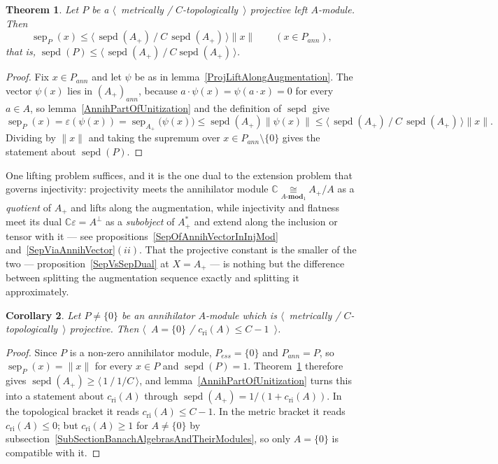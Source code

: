 \documentclass[11pt]{article}
\theoremstyle{plain}
\newtheorem{theorem}{Theorem}[section]
\newtheorem{corollary}[theorem]{Corollary}
\theoremstyle{definition}
\newcommand{\isom}[1]{\mathrel{\mathop{\cong}\limits_{#1}}}
\DeclareMathOperator{\sep}{sep}
\DeclareMathOperator{\sepd}{sepd}
\newcommand{\cri}{c_{\mathrm{ri}}}
\begin{document}
\begin{theorem}\label{SepOfProjMod}
Let $P$ be a $\langle$~metrically / $C$-topologically~$\rangle$ projective left
$A$-module. Then
\[
\sep_P(x)\leq\langle\,\sepd(A_+)\ /\ C\,\sepd(A_+)\,\rangle\lVert x\rVert
\qquad(x\in P_{ann}),
\]
that is, $\sepd(P)\leq\langle\,\sepd(A_+)\ /\ C\sepd(A_+)\,\rangle$.
\end{theorem}

\begin{proof}
Fix $x\in P_{ann}$ and let $\psi$ be as in
lemma~\ref{ProjLiftAlongAugmentation}. The vector $\psi(x)$ lies in
${(A_+)}_{ann}$, because $a\cdot\psi(x)=\psi(a\cdot x)=0$ for every $a\in A$, so
lemma~\ref{AnnihPartOfUnitization} and the definition of $\sepd$ give
\[
\sep_P(x)=\varepsilon(\psi(x))=\sep_{A_+} \bigl(\psi(x) \bigr)
\leq\sepd(A_+)\lVert\psi(x)\rVert
\leq\langle\,\sepd(A_+)\ /\ C\,\sepd(A_+)\,\rangle\lVert x\rVert .
\]
Dividing by $\lVert x\rVert$ and taking the supremum over
$x\in P_{ann}\setminus \{0 \}$ gives the statement about $\sepd(P)$.
\end{proof}

One lifting problem suffices, and it is the one dual to the extension problem
that governs injectivity: projectivity meets the annihilator module
$\mathbb{C}\isom{A\text{-}\mathbf{mod}_1}A_+/A$ as a \emph{quotient} of $A_+$ and
lifts along the augmentation, while injectivity and flatness meet its dual
$\mathbb{C}\varepsilon=A^\perp$ as a \emph{subobject} of $A_+^*$ and extend along
the inclusion or tensor with it --- see
propositions~\ref{SepOfAnnihVectorInInjMod} and~\ref{SepViaAnnihVector}$(ii)$.
That the projective constant is the smaller of the two ---
proposition~\ref{SepVsSepDual} at $X=A_+$ --- is nothing but the difference
between splitting the augmentation sequence exactly and splitting it
approximately.

\begin{corollary}\label{ProjAnnihMod}
Let $P\neq \{0 \}$ be an annihilator $A$-module which is
$\langle$~metrically / $C$-topologically~$\rangle$ projective. Then
$\langle$~$A= \{0 \}$ / $\cri(A)\leq C-1$~$\rangle$.
\end{corollary}

\begin{proof}
Since $P$ is a non-zero annihilator module, $P_{ess}= \{0 \}$ and $P_{ann}=P$, so
$\sep_P(x)=\lVert x\rVert$ for every $x\in P$ and $\sepd(P)=1$.
Theorem~\ref{SepOfProjMod} therefore gives
$\sepd(A_+)\geq\langle\,1\ /\ 1/C\,\rangle$, and
lemma~\ref{AnnihPartOfUnitization} turns this into a statement about $\cri(A)$
through $\sepd(A_+)=1/(1+\cri(A))$. In the topological bracket it reads
$\cri(A)\leq C-1$. In the metric bracket it reads $\cri(A)\leq 0$; but
$\cri(A)\geq 1$ for $A\neq \{0 \}$ by
subsection~\ref{SubSectionBanachAlgebrasAndTheirModules}, so only $A= \{0 \}$ is
compatible with it.
\end{proof}
\end{document}
